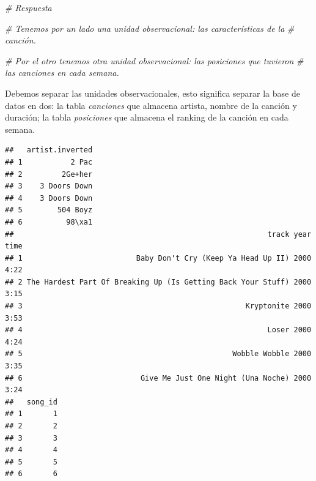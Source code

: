 \documentclass[]{article}
\newenvironment{Shaded}{\begin{snugshade}}{\end{snugshade}}
\newcommand{\KeywordTok}[1]{\textcolor[rgb]{0.13,0.29,0.53}{\textbf{{#1}}}}
\newcommand{\DataTypeTok}[1]{\textcolor[rgb]{0.13,0.29,0.53}{{#1}}}
\newcommand{\StringTok}[1]{\textcolor[rgb]{0.31,0.60,0.02}{{#1}}}
\newcommand{\CommentTok}[1]{\textcolor[rgb]{0.56,0.35,0.01}{\textit{{#1}}}}
\newcommand{\NormalTok}[1]{{#1}}
\begin{document}
\begin{Shaded}
\begin{Highlighting}[]
\CommentTok{# Respuesta}

\CommentTok{# Tenemos por un lado una unidad observacional: las características de la}
\CommentTok{# canción.}

\CommentTok{# Por el otro tenemos otra unidad observacional: las posiciones que tuvieron }
\CommentTok{# las canciones en cada semana.}
\end{Highlighting}
\end{Shaded}

Debemos separar las unidades observacionales, esto significa separar la
base de datos en dos: la tabla \emph{canciones} que almacena artista,
nombre de la canción y duración; la tabla \emph{posiciones} que almacena
el ranking de la canción en cada semana.

\begin{Shaded}
\end{Shaded}

\begin{verbatim}
##   artist.inverted
## 1           2 Pac
## 2         2Ge+her
## 3    3 Doors Down
## 4    3 Doors Down
## 5        504 Boyz
## 6          98\xa1
##                                                          track year time
## 1                          Baby Don't Cry (Keep Ya Head Up II) 2000 4:22
## 2 The Hardest Part Of Breaking Up (Is Getting Back Your Stuff) 2000 3:15
## 3                                                   Kryptonite 2000 3:53
## 4                                                        Loser 2000 4:24
## 5                                                Wobble Wobble 2000 3:35
## 6                           Give Me Just One Night (Una Noche) 2000 3:24
##   song_id
## 1       1
## 2       2
## 3       3
## 4       4
## 5       5
## 6       6
\end{verbatim}
\end{document}
